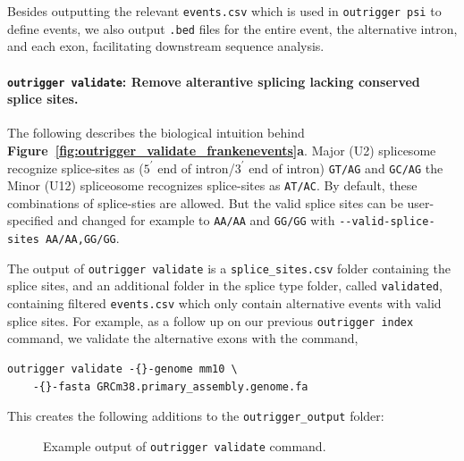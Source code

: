Besides outputting the relevant \texttt{events.csv} which is used in \texttt{outrigger psi} to define events, we also output \texttt{.bed} files for the entire event, the alternative intron, and each exon, facilitating downstream sequence analysis.


\paragraph{\texttt{outrigger validate}: Remove alterantive splicing lacking conserved splice sites.} The following describes the biological intuition behind \textbf{Figure~\ref{fig:outrigger_validate_frankenevents}a}. Major (U2) splicesome recognize splice-sites as  ($5^\prime$ end of intron/$3^\prime$ end of intron) \texttt{GT/AG} and \texttt{GC/AG} the Minor (U12) spliceosome recognizes splice-sites as \texttt{AT/AC}\cite{McManus:2011en,GarciaBlanco:2004kl}. By default, these combinations of splice-sties are allowed. But the valid splice sites can be user-specified and changed for example to \texttt{AA/AA} and \texttt{GG/GG} with \texttt{-{}-valid-splice-sites~AA/AA,GG/GG}.

The output of \texttt{outrigger validate} is a \texttt{splice\_sites.csv} folder containing the splice sites, and an additional folder in the splice type folder, called \texttt{validated}, containing filtered \texttt{events.csv} which only contain alternative events with valid splice sites. For example, as a follow up on our previous \texttt{outrigger index} command, we validate the alternative exons with the command,

\begin{verbatim}
outrigger validate -{}-genome mm10 \
    -{}-fasta GRCm38.primary_assembly.genome.fa
\end{verbatim}

This creates the following additions to the \texttt{outrigger\_output} folder:

\begin{figure}
\small
{}
\caption{Example output of \texttt{outrigger validate} command.}
\end{figure}


